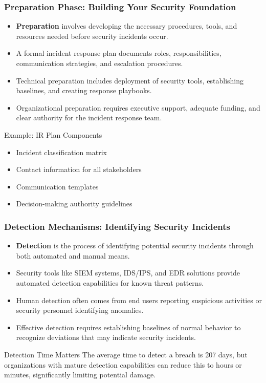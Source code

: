 \documentclass{beamer}
\begin{document}
\begin{frame}
\frametitle{Preparation Phase: Building Your Security Foundation}
\begin{itemize}
\item \textbf{Preparation} involves developing the necessary procedures, tools, and resources needed before security incidents occur.
\item A formal incident response plan documents roles, responsibilities, communication strategies, and escalation procedures.
\item Technical preparation includes deployment of security tools, establishing baselines, and creating response playbooks.
\item Organizational preparation requires executive support, adequate funding, and clear authority for the incident response team.
\end{itemize}

\begin{exampleblock}{Example: IR Plan Components}
\begin{itemize}
\item Incident classification matrix
\item Contact information for all stakeholders
\item Communication templates
\item Decision-making authority guidelines
\end{itemize}
\end{exampleblock}
\end{frame}


\begin{frame}
\frametitle{Detection Mechanisms: Identifying Security Incidents}
\begin{itemize}
\item \textbf{Detection} is the process of identifying potential security incidents through both automated and manual means.
\item Security tools like SIEM systems, IDS/IPS, and EDR solutions provide automated detection capabilities for known threat patterns.
\item Human detection often comes from end users reporting suspicious activities or security personnel identifying anomalies.
\item Effective detection requires establishing baselines of normal behavior to recognize deviations that may indicate security incidents.
\end{itemize}

\begin{block}{Detection Time Matters}
The average time to detect a breach is 207 days, but organizations with mature detection capabilities can reduce this to hours or minutes, significantly limiting potential damage.
\end{block}
\end{frame}
\end{document}
